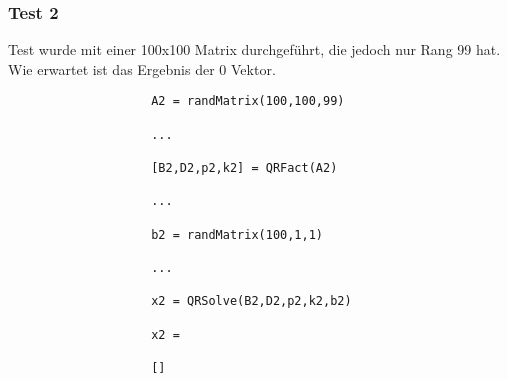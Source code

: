 \documentclass[11pt,titlepage]{article}
\begin{document}
			\subsubsection{Test 2}
			Test wurde mit einer 100x100 Matrix durchgeführt, die jedoch nur Rang 99 hat. Wie erwartet ist das Ergebnis der 0 Vektor.
				\begin{lstlisting}
					A2 = randMatrix(100,100,99)
					
					...
					
					[B2,D2,p2,k2] = QRFact(A2)
					
					...
					
					b2 = randMatrix(100,1,1)
					
					...
					
					x2 = QRSolve(B2,D2,p2,k2,b2)
					
					x2 =
					
					[]
				\end{lstlisting}
\end{document}
